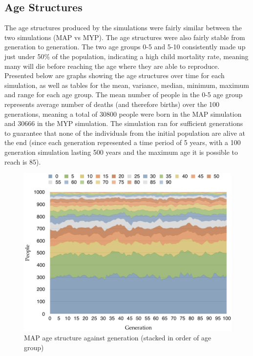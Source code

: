 \documentclass[authoryearcitations]{UoYCSproject}
\begin{document}
\subsection{Age Structures}
The age structures produced by the simulations were fairly similar between the two simulations (MAP vs MYP). The age structures were also fairly stable from generation to generation. The two age groups 0-5 and 5-10 consistently made up just under 50\% of the population, indicating a high child mortality rate, meaning many will die before reaching the age where they are able to reproduce. Presented below are graphs showing the age structures over time for each simulation, as well as tables for the mean, variance, median, minimum, maximum and range for each age group. The mean number of people in the 0-5 age group represents average number of deaths (and therefore births) over the 100 generations, meaning a total of 30800 people were born in the MAP simulation and 30666 in the MYP simulation. The simulation ran for sufficient generations to guarantee that none of the individuals from the initial population are alive at the end (since each generation represented a time period of 5 years, with a 100 generation simulation lasting 500 years and the maximum age it is possible to reach is 85).

\begin{figure}[h]
\includegraphics[scale=0.6]{map_age_data}
\caption{MAP age structure against generation (stacked in order of age group)}
\label{fig:mapResultsGraph}
\end{figure}
\end{document}
